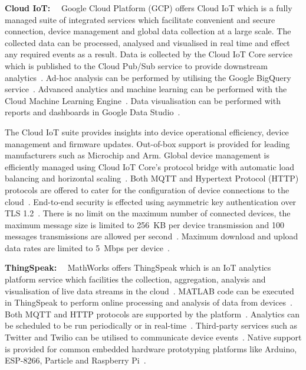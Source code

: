\documentclass[10pt,twocolumn]{witseiepaper}
\begin{document}
				\textbf{Cloud IoT:}~~
				Google Cloud Platform (GCP) offers Cloud IoT which is a fully managed suite of integrated services which facilitate convenient and secure connection, device management and global data collection at a large scale. The collected data can be processed, analysed and visualised in real time and effect any required events as a result. Data is collected by the Cloud IoT Core service which is published to the Cloud Pub/Sub service to provide downstream analytics~\cite{cloud-iot}. Ad-hoc analysis can be performed by utilising the Google BigQuery service~\cite{cloud-iot}. Advanced analytics and machine learning can be performed with the Cloud Machine Learning Engine~\cite{cloud-iot}. Data visualisation can be performed with reports and dashboards in Google Data Studio~\cite{cloud-iot}.
				
				The Cloud IoT suite provides insights into device operational efficiency, device management and firmware updates. Out-of-box support is provided for leading manufacturers such as Microchip and Arm. Global device management is efficiently managed using Cloud IoT Core's protocol bridge with automatic load balancing and horizontal scaling~\cite{cloud-iot}. Both MQTT and Hypertext Protocol (HTTP) protocols are offered to cater for the configuration of device connections to the cloud~\cite{gcp-security}. End-to-end security is effected using asymmetric key authentication over TLS 1.2~\cite{gcp-security}. There is no limit on the maximum number of connected devices, the maximum message size is limited to 256~KB per device transmission and 100 messages transmissions are allowed per second~\cite{gcp-quota}. Maximum download and upload data rates are limited to 5~Mbps per device~\cite{gcp-quota}.
			
				\textbf{ThingSpeak:}~~
				MathWorks offers ThingSpeak which is an IoT analytics platform service which facilities the collection, aggregation, analysis and visualisation of live data streams in the cloud~\cite{thingspeak}. MATLAB code can be executed in ThingSpeak to perform online processing and analysis of data from devices~\cite{thingspeak}. Both MQTT and HTTP protocols are supported by the platform~\cite{thingspeak}. Analytics can be scheduled to be run periodically or in real-time~\cite{thingspeak}. Third-party services such as Twitter and Twilio can be utilised to communicate device events~\cite{thingspeak}. Native support is provided for common embedded hardware prototyping platforms like Arduino, ESP-8266, Particle and Raspberry Pi~\cite{thingspeak}.
				
\end{document}
